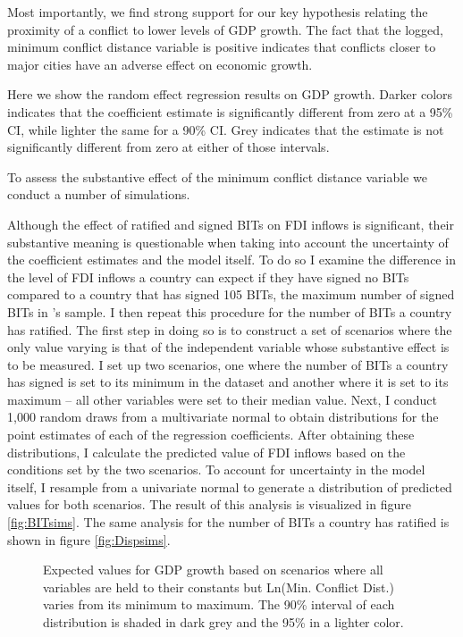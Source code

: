 Most importantly, we find strong support for our key hypothesis relating the proximity of a conflict to lower levels of GDP growth. The fact that the logged, minimum conflict distance variable is positive indicates that conflicts closer to major cities have an adverse effect on economic growth. 

\begin{figure}[ht]
	\centering
	\resizebox{.6\textwidth}{!}{}
\end{figure}
	\caption{Here we show the random effect regression results on GDP growth. Darker colors indicates that the coefficient estimate is significantly different from zero at a 95\% CI, while lighter the same for a 90\% CI. Grey indicates that the estimate is not significantly different from zero at either of those intervals.}
	\label{fig:coefPlot}
\FloatBarrier

To assess the substantive effect of the minimum conflict distance variable we conduct a number of simulations. 

Although the effect of ratified and signed BITs on FDI inflows is significant, their substantive meaning is questionable when taking into account the uncertainty of the coefficient estimates and the model itself. To do so I examine the difference in the level of FDI inflows a country can expect if they have signed no BITs compared to a country that has signed 105 BITs, the maximum number of signed BITs in \citeauthor{allee2011contingent}'s sample. I then repeat this procedure for the number of BITs a country has ratified. The first step in doing so is to construct a set of scenarios where the only value varying is that of the independent variable whose substantive effect is to be measured. I set up two scenarios, one where the number of BITs a country has signed is set to its minimum in the dataset and another where it is set to its maximum -- all other variables were set to their median value. Next, I conduct 1,000 random draws from a multivariate normal to obtain distributions for the point estimates of each of the regression coefficients. After obtaining these distributions, I calculate the predicted value of FDI inflows based on the conditions set by the two scenarios. To account for uncertainty in the model itself, I resample from a univariate normal to generate a distribution of predicted values for both scenarios. The result of this analysis is visualized in figure \ref{fig:BITsims}. The same analysis for the number of BITs a country has ratified is shown in figure \ref{fig:Dispsims}.

\begin{figure}[ht]
	\centering
	\resizebox{.8\textwidth}{!}{}
	\caption{Expected values for GDP growth based on scenarios where all variables are held to their constants but Ln(Min. Conflict Dist.) varies from its minimum to maximum. The 90\% interval of each distribution is shaded in dark grey and the 95\% in a lighter color.}
	\label{fig:simsPlot}
\end{figure}
\FloatBarrier